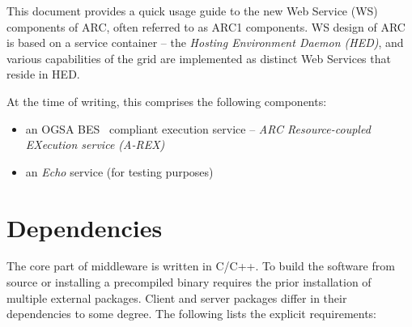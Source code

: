 \documentclass{article}                            %
\begin{document}
This document provides a quick usage guide to the new Web Service (WS)
components of ARC, often referred to as ARC1 components. WS design of ARC is
based on a service container -- the \textit{Hosting Environment Daemon (HED)},
and various capabilities of the grid are implemented as distinct Web Services
that reside in HED.

At the time of writing, this comprises the following components:
\begin{itemize}
\item an OGSA BES~\cite{ogsa-bes} compliant execution service --
\textit{ARC Resource-coupled EXecution service (A-REX)}~\cite{arex}
\item an \textit{Echo} service (for testing purposes)
\end{itemize}

\section{Dependencies}
\label{sec:deps}

The core part of middleware is written in C/C++. To build the software
from source or installing a precompiled binary requires the prior installation
of multiple external packages. Client and server packages differ in their
dependencies to some degree. The following lists the explicit requirements:
\end{document}
